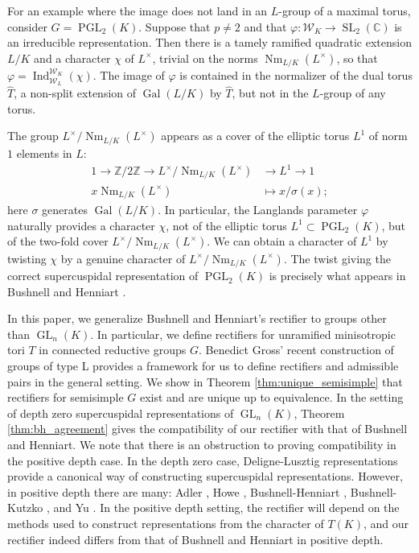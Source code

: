 \documentclass{compositio}
\theoremstyle{plain}
\theoremstyle{definition}
\DeclareMathOperator{\Gal}{Gal}
\DeclareMathOperator{\Nm}{Nm}
\DeclareMathOperator{\Ind}{Ind}
\DeclareMathOperator{\GL}{GL}
\DeclareMathOperator{\PGL}{PGL}
\DeclareMathOperator{\SL}{SL}
\newcommand{\CC}{\mathbb{C}}
\newcommand{\Lx}{L^\times}
\newcommand{\Weil}{\mathcal{W}}
\begin{document}
For an example where the image does not land in an $L$-group of a maximal torus,
consider $G = \PGL_{2}(K)$.  Suppose that $p \neq 2$ and that
$\varphi : \Weil_K \rightarrow \SL_{2}(\CC)$ is an
irreducible representation.  Then there is a tamely ramified quadratic
extension $L/K$ and a character
$\chi$ of $\Lx$, trivial on the norms $\Nm_{L/K}(\Lx)$, so that
$\varphi = \Ind_{\Weil_L}^{\Weil_K}(\chi)$.  The image of $\varphi$
is contained in the normalizer of the dual torus $\hat{T}$, a non-split
extension of $\Gal(L/K)$ by $\hat{T}$, but not in the $L$-group of any torus.

The group $\Lx / \Nm_{L/K}(\Lx)$ appears as a cover of the elliptic torus $L^1$ of norm $1$ elements in $L$:
\begin{align*}
1 \rightarrow \mathbb{Z} / 2 \mathbb{Z} \rightarrow \Lx / \Nm_{L/K}(\Lx) &\rightarrow L^1 \rightarrow 1 \\
x \Nm_{L/K}(L^{\times}) &\mapsto x / \sigma(x);
\end{align*}
here $\sigma$ generates $\Gal(L/K)$.  In particular, the Langlands parameter
$\varphi$ naturally provides a character $\chi$, not of the elliptic torus
$L^1 \subset \PGL_2(K)$,
but of the two-fold cover $\Lx / \Nm_{L/K}(\Lx)$.  We can obtain a character of $L^1$
by twisting $\chi$ by a genuine character of
$\Lx / \Nm_{L/K}(\Lx)$.  The twist giving the correct supercuspidal representation of $\PGL_2(K)$
is precisely what appears in Bushnell and Henniart \cite{bushnell-henniart:06a, bushnell-henniart:10a}.

In this paper, we generalize Bushnell and Henniart's
rectifier to groups other than $\GL_n(K)$.  In particular, we define rectifiers for
unramified minisotropic tori $T$ in connected reductive groups $G$.
Benedict Gross' recent construction of groups of type L provides a framework for
us to define rectifiers and admissible pairs in the general setting.
We show in Theorem \ref{thm:unique_semisimple} that rectifiers for semisimple $G$ exist
and are unique up to equivalence. In the setting of depth zero
supercuspidal representations of $\GL_{n}(K)$, Theorem \ref{thm:bh_agreement}
gives the compatibility of our rectifier with that of Bushnell and Henniart.
We note that there is an obstruction to proving compatibility in the positive depth case.
In the depth zero case, Deligne-Lusztig representations provide a canonical way of
constructing supercuspidal representations. However, in positive depth there are many:
Adler \cite{adler:98a}, Howe \cite{howe:77a}, Bushnell-Henniart \cite{bushnell-henniart:10a},
Bushnell-Kutzko \cite{bushnell-kutzko:AdmissibleDual}, and Yu \cite{yu:03a}.
In the positive depth setting, the rectifier will depend on the methods
used to construct representations from the character of $T(K)$, and
our rectifier indeed differs from that of Bushnell and Henniart in positive depth.
\end{document}
